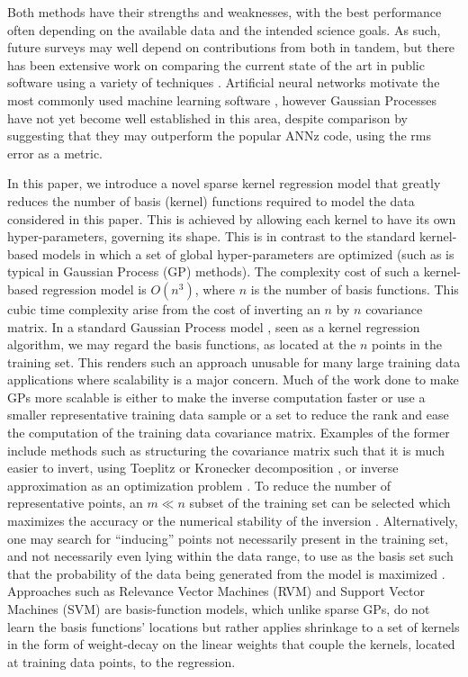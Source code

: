 \documentclass[useAMS,usenatbib,fleqn]{mn2e}
\begin{document}
Both methods have their strengths and weaknesses, with the best performance often depending on the available data and the intended science goals. As such, future surveys may well depend on contributions from both in tandem, but there has been extensive work on comparing the current state of the art in public software using a variety of techniques \citep{hildebrandt10,abdalla11,sanchez14}. Artificial neural networks motivate the most commonly used machine learning software \citep{Firth2003,vanzella2004photometric,brescia2014catalogue}, however Gaussian Processes \citep[e.g.][]{Way2009} have not yet become well established in this area, despite comparison by \citet{bonfield10} suggesting that they may outperform the popular {\sc ANNz} code, using the rms error as a metric. 


In this paper, we introduce a novel sparse kernel regression model that greatly reduces the number of basis (kernel) functions required to model the data considered in this paper. This is achieved by allowing each kernel to have its own hyper-parameters, governing its shape. This is in contrast to the standard kernel-based models in which a set of global hyper-parameters are optimized (such as is typical in Gaussian Process (GP) methods). The complexity cost of such a kernel-based regression model is $O\left(n^{3}\right)$, where $n$ is the number of basis functions. This cubic time complexity arise from the cost of inverting an $n$ by $n$ covariance matrix. In a standard Gaussian Process model \citep{rasmussen2006gaussian}, seen as a kernel regression algorithm, we may regard the basis functions, as located at the $n$ points in the training set. This renders such an approach unusable for many large training data applications where scalability is a major concern. Much of the work done to make GPs more scalable is either to make the inverse computation faster or use a smaller representative training data sample or a set to reduce the rank and ease the computation of the training data covariance matrix. Examples of the former include methods such as structuring the covariance matrix such that it is much easier to invert, using Toeplitz  \citep{zhang2005time} or Kronecker decomposition \citep{tsiligkaridis2013}, or inverse approximation as an optimization problem \citep{gibbs97}. To reduce the number of representative points, an $m \ll n$ subset of the training set can be selected which maximizes the accuracy or the numerical stability of the inversion \citep{foster2009}. Alternatively, one may search for ``inducing'' points not necessarily present in the training set, and not necessarily even lying within the data range, to use as the basis set such that the probability of the data being generated from the model is maximized \citep{snelson2005}. Approaches such as Relevance Vector Machines (RVM) \citep{tipping2001} and Support Vector Machines (SVM) \citep{smola1997} are basis-function models, which unlike sparse GPs, do not learn the basis functions' locations but rather applies shrinkage to a set of kernels in the form of weight-decay on the linear weights that couple the kernels, located at training data points, to the regression. 
\end{document}
